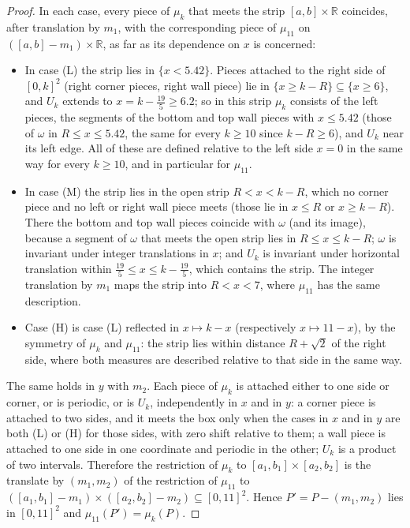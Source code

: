 \documentclass[11pt]{amsart}
\theoremstyle{definition}
\theoremstyle{remark}
\newcommand{\R}{\mathbb R}
\begin{document}
\begin{proof}
In each case, every piece of $\mu_k$ that meets the strip $[a,b]\times\R$ coincides, after translation by $m_1$, with
the corresponding piece of $\mu_{11}$ on $([a,b]-m_1)\times\R$, as far as its dependence on $x$ is concerned:
\begin{itemize}
\item In case (L) the strip lies in $\{x<5.42\}$. Pieces attached to the right side of $[0,k]^2$ (right corner
pieces, right wall piece) lie in $\{x\ge k-R\}\subseteq\{x\ge6\}$, and $U_k$ extends to $x=k-\frac{19}5\ge6.2$; so in
this strip $\mu_k$ consists of the left pieces, the segments of the bottom and top wall pieces with $x\le5.42$ (those
of $\omega$ in $R\le x\le5.42$, the same for every $k\ge10$ since $k-R\ge6$), and $U_k$ near its left edge. All of
these are defined relative to the left side $x=0$ in the same way for every $k\ge10$, and in particular for
$\mu_{11}$.
\item In case (M) the strip lies in the open strip $R<x<k-R$, which no corner piece and no left or right wall piece
meets (those lie in $x\le R$ or $x\ge k-R$). There the bottom and top wall pieces coincide with $\omega$ (and its
image), because a segment of $\omega$ that meets the open strip lies in $R\le x\le k-R$; $\omega$ is invariant
under integer translations in $x$; and $U_k$ is invariant under horizontal translation within
$\frac{19}5\le x\le k-\frac{19}5$, which contains the strip. The integer translation by $m_1$ maps the strip into
$R<x<7$, where $\mu_{11}$ has the same description.
\item Case (H) is case (L) reflected in $x\mapsto k-x$ (respectively $x\mapsto11-x$), by the symmetry of $\mu_k$ and
$\mu_{11}$: the strip lies within distance $R+\sqrt2$ of the right side, where both measures are described relative
to that side in the same way.
\end{itemize}
The same holds in $y$ with $m_2$. Each piece of $\mu_k$ is attached either to one side or corner, or is periodic, or is
$U_k$, independently in $x$ and in $y$: a corner piece is attached to two sides, and it meets the box only when the
cases in $x$ and in $y$ are both (L) or (H) for those sides, with zero shift relative to them; a wall piece is attached
to one side in one coordinate and periodic in the other; $U_k$ is a product of two intervals. Therefore the
restriction of $\mu_k$ to $[a_1,b_1]\times[a_2,b_2]$ is the translate by $(m_1,m_2)$ of the restriction of $\mu_{11}$
to $([a_1,b_1]-m_1)\times([a_2,b_2]-m_2)\subseteq[0,11]^2$. Hence $P'=P-(m_1,m_2)$ lies in $[0,11]^2$ and
$\mu_{11}(P')=\mu_k(P)$.
\end{proof}
\end{document}

